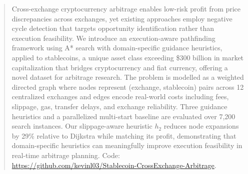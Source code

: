 \begin{abstract}
Cross-exchange cryptocurrency arbitrage enables low-risk profit from price discrepancies across exchanges, yet existing approaches employ negative cycle detection that targets opportunity identification rather than execution feasibility. We introduce an execution-aware pathfinding framework using A* search with domain-specific guidance heuristics, applied to stablecoins, a unique asset class exceeding \$300 billion in market capitalization that bridges cryptocurrency and fiat currency, offering a novel dataset for arbitrage research. The problem is modelled as a weighted directed graph where nodes represent (exchange, stablecoin) pairs across 12 centralized exchanges and edges encode real-world costs including fees, slippage, gas, transfer delays, and exchange reliability. Three guidance heuristics and a parallelized multi-start baseline are evaluated over 7{,}200 search instances. Our slippage-aware heuristic $h_2$ reduces node expansions by 29\% relative to Dijkstra while matching its profit, demonstrating that domain-specific heuristics can meaningfully improve execution feasibility in real-time arbitrage planning. Code: \url{https://github.com/kevinl03/Stablecoin-CrossExchange-Arbitrage}.
\end{abstract}
